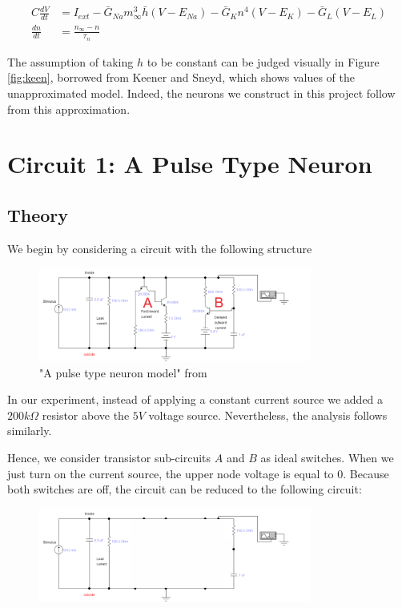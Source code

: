\documentclass[12]{book}
\newcommand\0{\mathbf{0}}
\newcommand\<{\langle}
\renewcommand\>{\rangle}
\begin{document}
\begin{align*}
        C\frac{dV}{dt} &= I_{ext} -\bar{G}_{Na}m_\infty^3\bar{h}(V-E_{Na}) -\bar{G}_{K}n^4(V-E_{K})  -\bar{G}_{L}(V-E_{L}) \\
    \frac{dn}{dt} &= \frac{n_{\infty}-n}{\tau_n} 
\end{align*}

The assumption of taking $h$ to be constant can be judged visually in Figure \ref{fig:keen}, borrowed from Keener and Sneyd, which shows values of the unapproximated model\cite{keener}. Indeed, the neurons we construct in this project follow from this approximation.

\section{Circuit 1: A Pulse Type Neuron}
\label{sec:pulse-neuron}

\subsection{Theory}
 
 We begin by considering a circuit with the following structure
 
\begin{figure}[H]
\centering
\includegraphics[width=0.8\textwidth]{exercise1-0}
\caption{"A pulse type neuron model" from \cite{maeda2000pulse}}
\label{fig:maeda-pulse}
\end{figure}

In our experiment, instead of applying a constant current source we added a $200k\Omega$ resistor above the $5V$ voltage source. Nevertheless, the analysis follows similarly.

Hence, we consider transistor sub-circuits $A$ and $B$ as ideal switches. When we just turn on the current source, the upper node voltage is equal to 0. Because both switches are off, the circuit can be reduced to the following circuit:
 
\begin{figure}[H]
\centering
\includegraphics[width=0.8\textwidth]{exercise1-1}
\end{figure}
\end{document}
